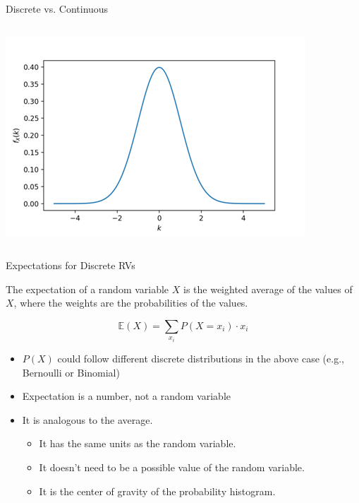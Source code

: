 \documentclass[aspectratio=169]{../latex_main/tntbeamer}  %
\begin{document}
\begin{frame}[c]{Discrete vs. Continuous}
\begin{columns}
\begin{column}{.5\textwidth}
	                    \centering
                        \includegraphics[scale=.5]{Bild5}
	        \end{column}
	    \end{columns}
	\end{frame}
	
	
	\begin{frame}{Expectations for Discrete RVs}
	
	    The expectation of a random variable $X$ is the weighted average of the values of $X$, where the weights are the probabilities of the values.
	    
	    \begin{equation}
	        \mathbb{E}(X) =  \sum_{x_i} P(X= x_i) \cdot x_i \nonumber
	    \end{equation}
	    
	    \begin{itemize}
	        \item $P(X)$ could follow different discrete distributions in the above case (e.g., Bernoulli or Binomial)
	    \end{itemize}

	    \begin{itemize}
	                \item Expectation is a number, not a random variable
	                \item It is analogous to the average.
	                \begin{itemize}
	                    \item It has the same units as the random variable.
	                    \item It doesn’t need to be a possible value of the random variable.
	                    \item It is the center of gravity of the probability histogram.
	                \end{itemize}
	    \end{itemize}

	\end{frame}
	
\end{document}
